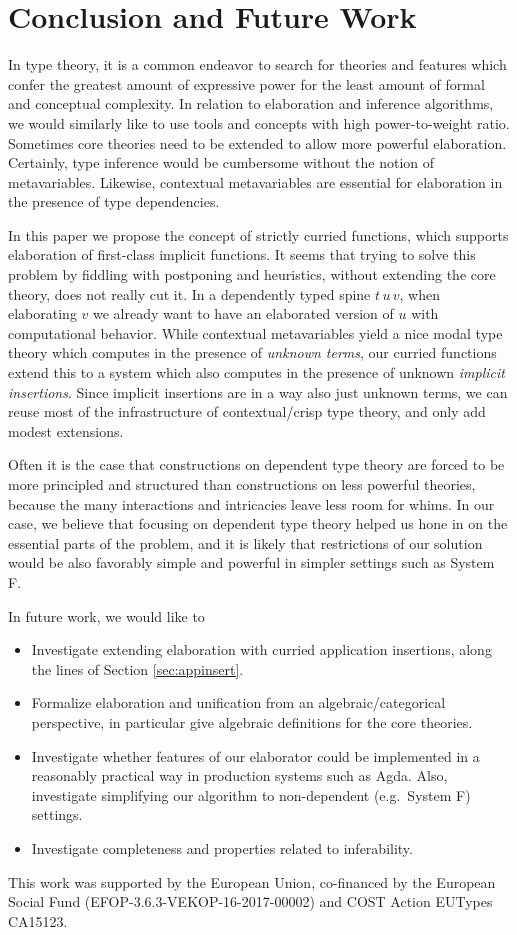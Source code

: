 \documentclass[acmsmall,review,anonymous,prologue,dvipsnames]{acmart}\settopmatter{printfolios=true,printccs=false,printacmref=false}
\theoremstyle{remark}
\begin{document}
\section{Conclusion and Future Work}

In type theory, it is a common endeavor to search for theories and features
which confer the greatest amount of expressive power for the least amount of
formal and conceptual complexity. In relation to elaboration and inference
algorithms, we would similarly like to use tools and concepts with high
power-to-weight ratio. Sometimes core theories need to be extended to allow more
powerful elaboration. Certainly, type inference would be cumbersome without the
notion of metavariables. Likewise, contextual metavariables are essential
for elaboration in the presence of type dependencies.

In this paper we propose the concept of strictly curried functions, which
supports elaboration of first-class implicit functions. It seems that trying to
solve this problem by fiddling with postponing and heuristics, without extending
the core theory, does not really cut it. In a dependently typed spine $t\,u\,v$, when
elaborating $v$ we already want to have an elaborated version of $u$ with
computational behavior. While contextual metavariables yield a nice modal type
theory which computes in the presence of \emph{unknown terms}, our curried
functions extend this to a system which also computes in the presence of
unknown \emph{implicit insertions}. Since implicit insertions are in a way also
just unknown terms, we can reuse most of the infrastructure of contextual/crisp
type theory, and only add modest extensions.

Often it is the case that constructions on dependent type theory are forced to
be more principled and structured than constructions on less powerful theories,
because the many interactions and intricacies leave less room for whims. In our
case, we believe that focusing on dependent type theory helped us hone in on the
essential parts of the problem, and it is likely that restrictions of our
solution would be also favorably simple and powerful in simpler settings such as
System F.

In future work, we would like to
\begin{itemize}
\item Investigate extending elaboration with curried application insertions, along the lines
      of Section \ref{sec:appinsert}.
\item Formalize elaboration and unification from an algebraic/categorical perspective, in particular
      give algebraic definitions for the core theories.
\item Investigate whether features of our elaborator could be implemented in a
      reasonably practical way in production systems such as Agda. Also, investigate
      simplifying our algorithm to non-dependent (e.g.\ System F) settings.
\item Investigate completeness and properties related to inferability.
\end{itemize}


\begin{acks}
  This work was supported by the European Union, co-financed by the
  European Social Fund (EFOP-3.6.3-VEKOP-16-2017-00002) and COST Action
  EUTypes CA15123.
\end{acks}


\end{document}
